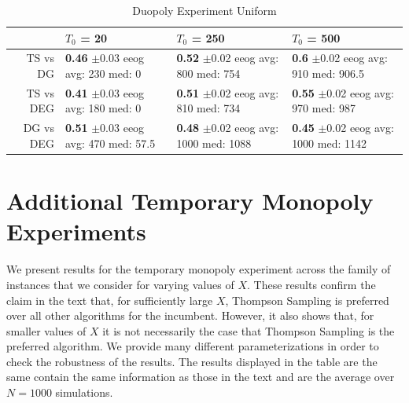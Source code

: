 \documentclass[11pt,letterpaper]{article}
\begin{document}
\begin{table}[H]
\centering
\caption{Duopoly Experiment Uniform} 
\begin{tabular}{rlll}
  \hline
 & $T_0$ = 20 & $T_0$ = 250 & $T_0$ = 500 \\ 
  \hline
TS vs DG & \makecell{\textbf{0.46} $\pm$0.03\\ eeog \\ avg: 230\\ med: 0} & \makecell{\textbf{0.52} $\pm$0.02\\ eeog \\ avg: 800\\ med: 754} & \makecell{\textbf{0.6} $\pm$0.02\\ eeog \\ avg: 910\\ med: 906.5} \\ 
  TS vs DEG & \makecell{\textbf{0.41} $\pm$0.03\\ eeog \\ avg: 180\\ med: 0} & \makecell{\textbf{0.51} $\pm$0.02\\ eeog \\ avg: 810\\ med: 734} & \makecell{\textbf{0.55} $\pm$0.02\\ eeog \\ avg: 970\\ med: 987} \\ 
  DG vs DEG & \makecell{\textbf{0.51} $\pm$0.03\\ eeog \\ avg: 470\\ med: 57.5} & \makecell{\textbf{0.48} $\pm$0.02\\ eeog \\ avg: 1000\\ med: 1088} & \makecell{\textbf{0.45} $\pm$0.02\\ eeog \\ avg: 1000\\ med: 1142} \\ 
   \hline
\end{tabular}
\end{table}

\newpage

\section{Additional Temporary Monopoly Experiments}

We present results for the temporary monopoly experiment across the family of instances that we consider for varying values of $X$. These results confirm the claim in the text that, for sufficiently large $X$, Thompson Sampling is preferred over all other algorithms for the incumbent. However, it also shows that, for smaller values of $X$ it is not necessarily the case that Thompson Sampling is the preferred algorithm. We provide many different parameterizations in order to check the robustness of the results. The results displayed in the table are the same contain the same information as those in the text and are the average over $N = 1000$ simulations.
\end{document}

